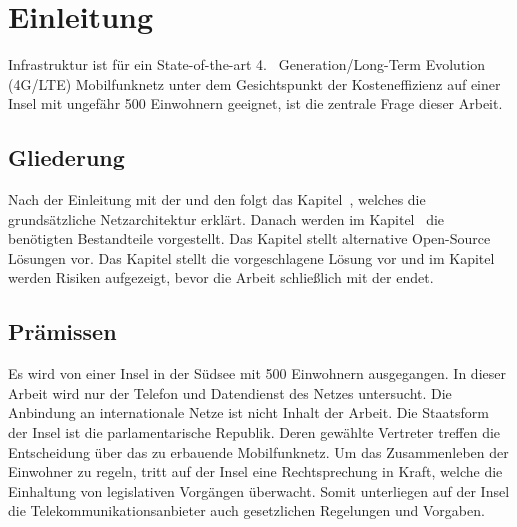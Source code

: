 
%
%
% 
% 
% 

\section{Einleitung}
\label{sec:einleitung}
 Infrastruktur ist für ein State-of-the-art  4.~ Generation/Long-Term Evolution (4G/LTE)  Mobilfunknetz unter dem Gesichtspunkt der Kosteneffizienz auf einer Insel mit ungefähr 500 Einwohnern geeignet, ist die zentrale Frage dieser Arbeit.
\subsection{Gliederung}
\label{subsec:gliederung}
Nach der Einleitung mit der  und den  folgt das Kapitel~, welches die grundsätzliche Netzarchitektur erklärt. Danach werden im Kapitel~ die benötigten Bestandteile vorgestellt. Das Kapitel  stellt alternative Open-Source Lösungen vor. Das Kapitel  stellt die vorgeschlagene Lösung vor und im Kapitel  werden Risiken aufgezeigt, bevor die Arbeit schließlich mit der  endet.
\subsection{Prämissen}
\label{subsec:praemissen}
Es wird von einer Insel in der Südsee mit 500 Einwohnern ausgegangen. In dieser Arbeit wird nur der Telefon und Datendienst des Netzes untersucht. Die Anbindung an internationale Netze ist nicht Inhalt der Arbeit. Die Staatsform der Insel ist die parlamentarische Republik. Deren gewählte Vertreter treffen die Entscheidung über das zu erbauende Mobilfunknetz. Um das Zusammenleben der Einwohner zu regeln, tritt auf der Insel eine Rechtsprechung in Kraft, welche die Einhaltung von legislativen Vorgängen überwacht. Somit unterliegen auf der Insel die Telekommunikationsanbieter auch gesetzlichen Regelungen und Vorgaben.


